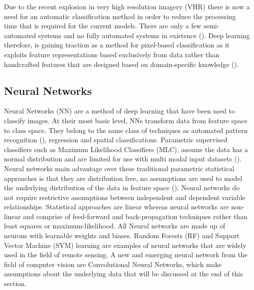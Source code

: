 \par
Due to the recent explosion in very high resolution imagery (VHR) there is now a need for an automatic classification method in order to reduce the processing time that is required for the current models. There are only a few semi-automated systems and no fully automated systems in existence (\cite{baltsavias04,mayer08,mnih13}). Deep learning therefore, is gaining traction as a method for pixel-based classification as it exploits feature representations based exclusively from data rather than handcrafted features that are designed based on domain-specific knowledge (\cite{xiao17,maggiori17a}). 
\paragraph{}
\subsection*{Neural Networks}
Neural Networks (NN) are a method of deep learning that have been used to classify images. At their most basic level, NNs transform data from feature space to class space. They belong to the same class of techniques as automated pattern recognition (\cite{Ritter89}), regression and spatial classifications. Parametric supervised classifiers such as Maximum Likelihood Classifiers (MLC), assume the data has a normal distribution and are limited for use with multi modal input datasets (\cite{Liu11}). Neural networks main advantage over these traditional parametric statistical approaches is that they are distribution free, no assumptions are used to model the underlying distribution of the data in feature space (\cite{Patricia97}). Neural networks do not require restrictive assumptions between independent and dependent variable relationships. Statistical approaches are linear whereas neural networks are non-linear and comprise of feed-forward and back-propagation techniques rather than least squares or maximum-likelihood. All Neural networks are made up of neurons with learnable weights and biases. Random Forests (RF) and Support Vector Machine (SVM) learning are examples of neural networks that are widely used in the field of remote sensing. A new and emerging neural network from the field of computer vision are Convolutional Neural Networks, which make assumptions about the underlying data that will be discussed at the end of this section. 
